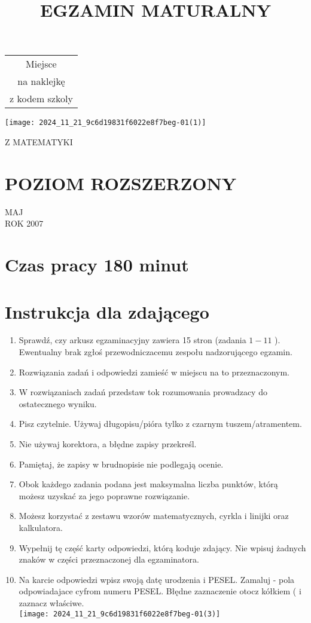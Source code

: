 \documentclass[10pt]{article}
\title{EGZAMIN MATURALNY }
\author{}
\date{}
\begin{document}
\maketitle
\begin{center}
\begin{tabular}{|c|}
\hline
Miejsce \\
na naklejkę \\
z kodem szkoly \\
\hline
\end{tabular}
\end{center}

\begin{center}
\texttt{[image: 2024\_11\_21\_9c6d19831f6022e8f7beg-01(1)]}
\end{center}

Z MATEMATYKI

\section*{POZIOM ROZSZERZONY}
MAJ\\
ROK 2007

\section*{Czas pracy 180 minut}
\section*{Instrukcja dla zdającego}
\begin{enumerate}
  \item Sprawdź, czy arkusz egzaminacyjny zawiera 15 stron (zadania \(1-11\) ). Ewentualny brak zgłoś przewodniczacemu zespołu nadzorującego egzamin.
  \item Rozwiązania zadań i odpowiedzi zamieść w miejscu na to przeznaczonym.
  \item W rozwiązaniach zadań przedstaw tok rozumowania prowadzacy do ostatecznego wyniku.
  \item Pisz czytelnie. Używaj długopisu/pióra tylko z czarnym tuszem/atramentem.
  \item Nie używaj korektora, a błędne zapisy przekreśl.
  \item Pamiętaj, że zapisy w brudnopisie nie podlegają ocenie.
  \item Obok każdego zadania podana jest maksymalna liczba punktów, którą możesz uzyskać za jego poprawne rozwiązanie.
  \item Możesz korzystać z zestawu wzorów matematycznych, cyrkla i linijki oraz kalkulatora.
  \item Wypełnij tę część karty odpowiedzi, którą koduje zdający. Nie wpisuj żadnych znaków w części przeznaczonej dla egzaminatora.
  \item Na karcie odpowiedzi wpisz swoją datę urodzenia i PESEL. Zamaluj - pola odpowiadajace cyfrom numeru PESEL. Błędne zaznaczenie otocz kółkiem ( i zaznacz właściwe.\\
\texttt{[image: 2024\_11\_21\_9c6d19831f6022e8f7beg-01(3)]}
\end{enumerate}
\end{document}
